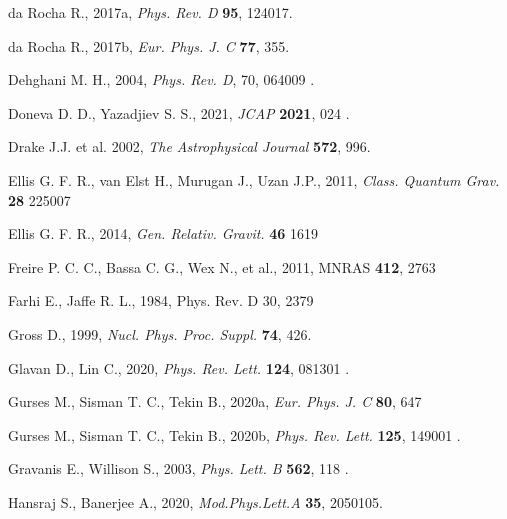 \documentclass[]{aastex631}
\begin{document}
\begin{thebibliography}{99}
 da Rocha R.,  2017a, {\em  Phys. Rev. D} {\bf 95}, 124017. 

 da Rocha R.,  2017b, {\em Eur. Phys. J. C} {\bf 77}, 355.


  Dehghani M. H., 2004, {\em Phys. Rev. D}, {  70}, 064009 .

 Doneva D. D., Yazadjiev S. S., 2021, {\em JCAP} {\bf 2021}, 024 .


 Drake J.J.  et al.  2002, {\em  The Astrophysical Journal} {\bf  572}, 996.

  Ellis G. F. R.,  van Elst H.,  Murugan J.,  Uzan J.P., 2011, {\em  Class. Quantum Grav.} {\bf 28} 225007 

  Ellis G. F. R., 2014, {\em Gen. Relativ. Gravit.}  {\bf 46} 1619

  Freire P. C. C.,  Bassa C. G.,  Wex N., et al., 2011, MNRAS {\bf 412}, 2763 

 Farhi E., Jaffe R. L., 1984, Phys. Rev. D 30, 2379 

  Gross D., 1999, {\em Nucl. Phys. Proc. Suppl.} {\bf 74},  426.

   Glavan D.,  Lin C., 2020, {\em Phys. Rev. Lett.} {\bf 124}, 081301 .

   Gurses M.,  Sisman T. C.,  Tekin B., 2020a, {\em Eur. Phys. J. C} {\bf 80}, 647 

  Gurses M.,  Sisman T. C.,  Tekin B., 2020b, {\em Phys. Rev. Lett.} {\bf 125}, 149001 .

	Gravanis E., Willison S., 2003,
{\em Phys. Lett. B} {\bf 562}, 118 .

  Hansraj S.,  Banerjee A.,  2020, {\em Mod.Phys.Lett.A} {\bf 35}, 2050105.


\end{thebibliography}
\end{document}
